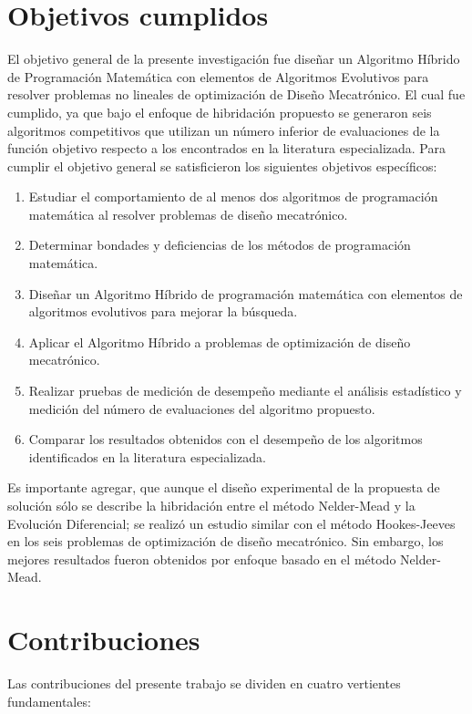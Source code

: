 	 \section{Objetivos cumplidos}
	  El objetivo general de la presente investigación fue diseñar un Algoritmo Híbrido de Programación Matemática con elementos de Algoritmos Evolutivos  para resolver problemas no lineales de optimización de  Diseño Mecatrónico. El cual fue cumplido, ya que bajo el enfoque de hibridación propuesto se generaron seis algoritmos competitivos que utilizan un número inferior de evaluaciones de la función objetivo respecto a los encontrados en la literatura especializada. Para cumplir el objetivo general se satisficieron los siguientes objetivos específicos:
	 \begin{enumerate}
	 	\item	Estudiar el comportamiento de al menos dos algoritmos de programación matemática al resolver problemas de diseño mecatrónico.
	 	\item	Determinar bondades y deficiencias de los métodos de programación matemática.
	 	\item	Diseñar un Algoritmo Híbrido de programación matemática con elementos de algoritmos evolutivos para mejorar la búsqueda.
	 	\item	Aplicar el Algoritmo Híbrido a problemas de optimización de diseño mecatrónico.
	 	\item	Realizar pruebas de medición de desempeño mediante el análisis estadístico y medición del número de evaluaciones del algoritmo propuesto.
	 	\item	Comparar los resultados obtenidos con el desempeño de los algoritmos identificados en la literatura especializada.
	 \end{enumerate}
	Es importante agregar, que aunque el diseño experimental de la propuesta de solución sólo se describe la hibridación entre el método Nelder-Mead y la Evolución Diferencial; se realizó un estudio similar con el método Hookes-Jeeves en los seis problemas de optimización de diseño mecatrónico. Sin embargo, los mejores resultados fueron obtenidos por enfoque basado en el método Nelder-Mead.  
 \section{Contribuciones}
 Las contribuciones del presente trabajo se dividen en cuatro vertientes fundamentales:
 
